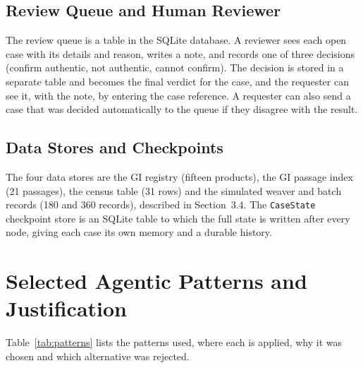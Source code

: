 \subsection{Review Queue and Human Reviewer}

The review queue is a table in the SQLite database. A reviewer sees each open case with its details
and reason, writes a note, and records one of three decisions (confirm authentic, not authentic, cannot
confirm). The decision is stored in a separate table and becomes the final verdict for the case, and
the requester can see it, with the note, by entering the case reference. A requester can also send a
case that was decided automatically to the queue if they disagree with the result.

\subsection{Data Stores and Checkpoints}

The four data stores are the GI registry (fifteen products), the GI passage index (21 passages), the
census table (31 rows) and the simulated weaver and batch records (180 and 360 records), described in
Section~3.4. The \texttt{CaseState} checkpoint store is an SQLite table to which the full state is
written after every node, giving each case its own memory and a durable history.

\section{Selected Agentic Patterns and Justification}

Table~\ref{tab:patterns} lists the patterns used, where each is applied, why it was chosen and which
alternative was rejected.

